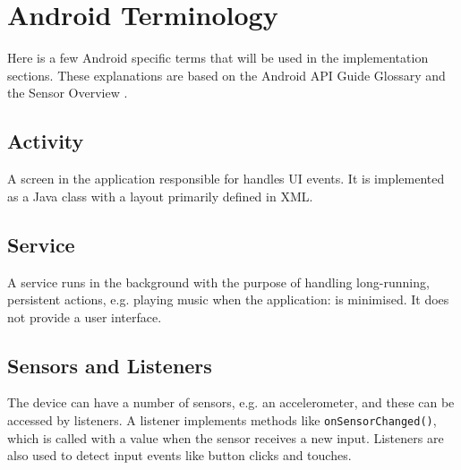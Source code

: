 \section{Android Terminology}
Here is a few Android specific terms that will be used in the implementation sections. These explanations are based on the Android API Guide Glossary \citep{android:terms} and the Sensor Overview \citep{android:sensor}.

\subsection*{Activity}
A screen in the application responsible for handles UI events. It is implemented as a Java class with a layout primarily defined in XML.


\subsection*{Service}
A service runs in the background with the purpose of handling long-running, persistent actions, e.g. playing music when the application: is minimised. It does not provide a user interface.

\subsection*{Sensors and Listeners}
The device can have a number of sensors, e.g. an accelerometer, and these can be accessed by listeners. A listener implements methods like \texttt{onSensorChanged()}, which is called with a value when the sensor receives a new input. Listeners are also used to detect input events like button clicks and touches.
